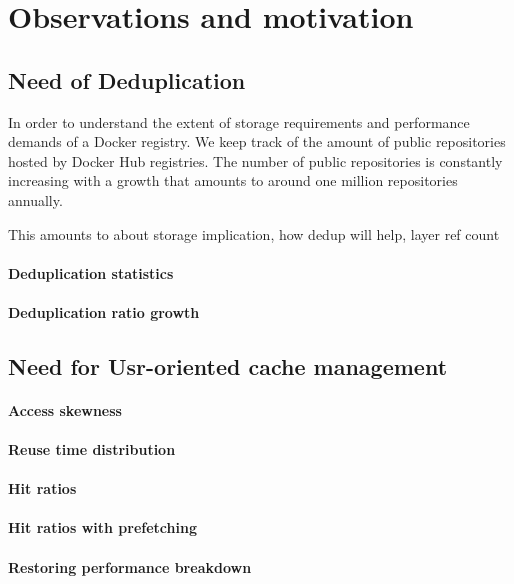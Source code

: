 \section{Observations and motivation} %
\label{sec:background}

\subsection{Need of Deduplication}

In order to understand the extent of storage requirements and performance demands of a Docker registry. We keep track of the amount of public repositories hosted by Docker Hub registries. The number of public repositories is constantly increasing with a growth that amounts to around one million repositories annually.

This amounts to about storage implication, how dedup will help, layer ref count 

\paragraph{Deduplication statistics} %

\paragraph{Deduplication ratio growth} %

\subsection{Need for Usr-oriented cache management}

\paragraph{Access skewness}

\paragraph{Reuse time distribution}

\paragraph{Hit ratios}

\paragraph{Hit ratios with prefetching}


\paragraph{Restoring performance breakdown}